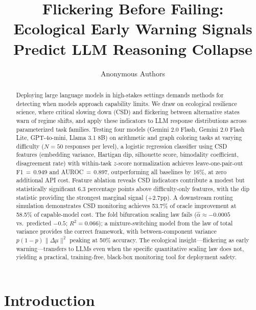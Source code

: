 \documentclass[11pt,letterpaper]{article}
\begin{document}
\title{Flickering Before Failing: Ecological Early Warning Signals\\Predict LLM Reasoning Collapse}

\author{Anonymous Authors}
\date{}
\maketitle

\begin{abstract}
Deploying large language models in high-stakes settings demands methods for detecting when models approach capability limits. We draw on ecological resilience science, where critical slowing down (CSD) and flickering between alternative states warn of regime shifts, and apply these indicators to LLM response distributions across parameterized task families. Testing four models (Gemini 2.0 Flash, Gemini 2.0 Flash Lite, GPT-4o-mini, Llama 3.1 8B) on arithmetic and graph coloring tasks at varying difficulty ($N{=}50$ responses per level), a logistic regression classifier using CSD features (embedding variance, Hartigan dip, silhouette score, bimodality coefficient, disagreement rate) with within-task $z$-score normalization achieves leave-one-pair-out F1$\,{=}\,$0.949 and AUROC$\,{=}\,$0.897, outperforming all baselines by 16\%, at zero additional API cost. Feature ablation reveals CSD indicators contribute a modest but statistically significant 6.3 percentage points above difficulty-only features, with the dip statistic providing the strongest marginal signal (+2.7pp). A downstream routing simulation demonstrates CSD monitoring achieves 53.7\% of oracle improvement at 58.5\% of capable-model cost. The fold bifurcation scaling law fails ($\hat{\alpha}{\approx}{-}0.0005$ vs.\ predicted ${-}0.5$; $R^2{=}0.066$); a mixture-switching model from the law of total variance provides the correct framework, with between-component variance $p(1{-}p)\|\Delta\mu\|^2$ peaking at 50\% accuracy. The ecological insight---flickering as early warning---transfers to LLMs even when the specific quantitative scaling law does not, yielding a practical, training-free, black-box monitoring tool for deployment safety.
\end{abstract}

\section{Introduction}
\label{sec:intro}
\end{document}
